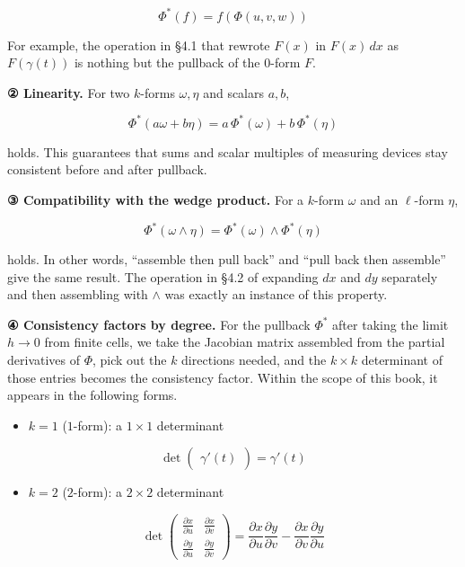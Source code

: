 \documentclass[a4paper,12pt,openany]{book}
\providecommand{\tightlist}{%
  \setlength{\itemsep}{0pt}\setlength{\parskip}{0pt}}
\begin{document}
\[\Phi^*(f) = f(\Phi(u,v,w))\]

For example, the operation in §4.1 that rewrote \(F(x)\) in \(F(x)\,dx\)
as \(F(\gamma(t))\) is nothing but the pullback of the \(0\)-form \(F\).

\textbf{② Linearity.} For two \(k\)-forms \(\omega, \eta\) and scalars
\(a,b\),

\[\Phi^*(a\omega + b\eta) = a\,\Phi^*(\omega) + b\,\Phi^*(\eta)\]

holds. This guarantees that sums and scalar multiples of measuring
devices stay consistent before and after pullback.

\textbf{③ Compatibility with the wedge product.} For a \(k\)-form
\(\omega\) and an \(\ell\)-form \(\eta\),

\[\Phi^*(\omega \wedge \eta) = \Phi^*(\omega) \wedge \Phi^*(\eta)\]

holds. In other words, ``assemble then pull back'' and ``pull back then
assemble'' give the same result. The operation in §4.2 of expanding
\(dx\) and \(dy\) separately and then assembling with \(\wedge\) was
exactly an instance of this property.

\textbf{④ Consistency factors by degree.} For the pullback \(\Phi^*\)
after taking the limit \(h\to0\) from finite cells, we take the Jacobian
matrix assembled from the partial derivatives of \(\Phi\), pick out the
\(k\) directions needed, and the \(k \times k\) determinant of those
entries becomes the consistency factor. Within the scope of this book,
it appears in the following forms.

\begin{itemize}
\tightlist
\item
  \(k=1\) (\(1\)-form): a \(1 \times 1\) determinant
\end{itemize}

\[
\det
\begin{pmatrix}
\gamma'(t)
\end{pmatrix}
=
\gamma'(t)
\]

\begin{itemize}
\tightlist
\item
  \(k=2\) (\(2\)-form): a \(2 \times 2\) determinant
\end{itemize}

\[
\det
\begin{pmatrix}
\frac{\partial x}{\partial u} & \frac{\partial x}{\partial v}\\[4pt]
\frac{\partial y}{\partial u} & \frac{\partial y}{\partial v}
\end{pmatrix}
=
\frac{\partial x}{\partial u}\frac{\partial y}{\partial v}
-
\frac{\partial x}{\partial v}\frac{\partial y}{\partial u}
\]
\end{document}
